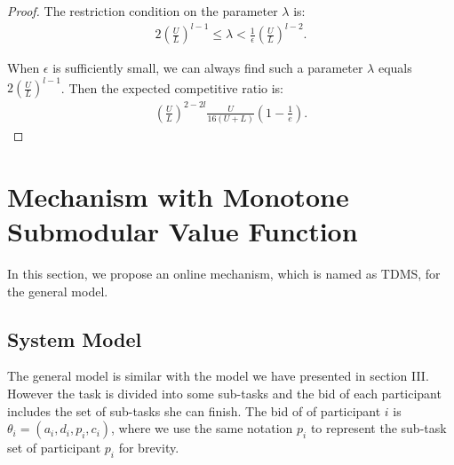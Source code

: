 \documentclass[10pt,journal,letterpaper,compsoc]{IEEEtran}
\begin{document}
\begin{proof}
The restriction condition on the parameter $\lambda$ is:
\begin{align}
2\left(\frac{U}{L}\right)^{l-1}\le\lambda < \frac{1}{\epsilon}\left(\frac{U}{L}\right)^{l-2}.
\end{align}

When $\epsilon$ is sufficiently small, we can always find such a parameter $\lambda$ equals $2\left(\frac{U}{L}\right)^{l-1}$. Then the expected competitive ratio is:
\begin{align}
\left(\frac{U}{L}\right)^{2-2l}\frac{U}{16(U+L)}(1-\frac{1}{e}). 
\end{align}
\end{proof}
\section{Mechanism with Monotone Submodular Value Function}
In this section, we propose an online mechanism, which is named as TDMS, for the general model.
\subsection{System Model}
The general model is similar with the model we have presented in section III. However the task is divided into some sub-tasks and the bid of each participant includes the set of sub-tasks she can finish. The bid of of participant $i$ is $\theta_i=(a_i,d_i,p_i,c_i)$, where we use the same notation $p_i$ to represent the sub-task set of participant $p_i$ for brevity.
\end{document}
